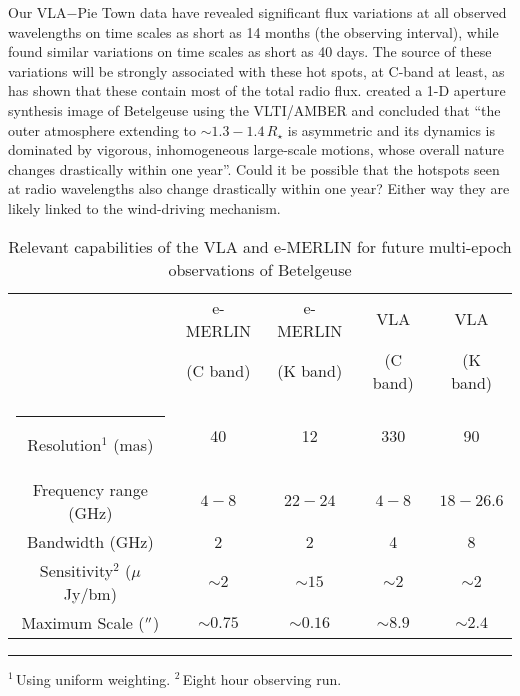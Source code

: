 Our VLA$-$Pie Town data have revealed significant flux variations at all observed wavelengths on time scales as short as 14 months (the observing interval), while \cite{drake_1992} found similar variations on time scales as short as 40 days. The source of these variations will be strongly associated with these hot spots, at C-band at least, as \cite{richards_2013} has shown that these contain most of the total radio flux. \cite{ohnaka_2011} created a 1-D aperture synthesis image of Betelgeuse using the VLTI/AMBER and concluded that  ``the outer atmosphere extending to $\sim 1.3 - 1.4\,R_{\star}$ is asymmetric and its dynamics is dominated by vigorous, inhomogeneous large-scale motions, whose overall nature changes drastically within one year''. Could it be possible that the hotspots seen at radio wavelengths also  change drastically within one year? Either way they are likely linked to the wind-driving mechanism.
\\
\begin{table}[hb]
\begin{center}
\caption[]{Relevant capabilities of the VLA and e-MERLIN for future multi-epoch observations of Betelgeuse}
\begin{tabular}{ccccc}
\hline
\hline
\rule{0pt}{2.5ex}  & e-MERLIN  & e-MERLIN & VLA  & VLA \\
\rule{0pt}{2.5ex}  & (C band) & (K band) & (C band) & (K band)\\
\hline
\rule{-2.5pt}{2.5ex}	Resolution$^{1}$ (mas) &  40 & 12 & 330&90\\
					Frequency range (GHz) &  $4-8$ & $22-24$ & $4-8$&$18-26.6$\\
					Bandwidth (GHz) &  2& 2 & 4&8\\
					Sensitivity$^{2}$ ($\mu$ Jy/bm) & $\sim 2$ & $\sim 15$&$\sim 2$&$\sim 2$\\
					Maximum Scale ($^{\prime\prime}$) & $\sim 0.75$ & $\sim 0.16$&$\sim 8.9$&$\sim 2.4$\\
\hline
\end{tabular}
\label{tab:8.1}
\begin{minipage}{12.5cm}
\rule{-2.5pt}{2.5ex}{\footnotesize $^{1}$\,Using uniform weighting. $^{2}$\,Eight hour observing run.}
\end{minipage}
\end{center}
\end{table}

